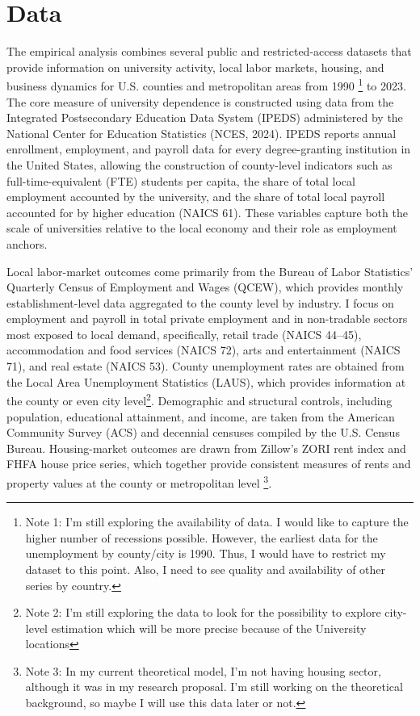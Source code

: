 
\newpage
\section{ Data}

\noindent The empirical analysis combines several public and restricted-access datasets that provide information on university activity, local labor markets, housing, and business dynamics for U.S. counties and metropolitan areas from 1990 \footnote{Note 1: I'm still exploring the availability of data. I would like to capture the higher number of recessions possible. However, the earliest data for the unemployment by county/city is 1990. Thus, I would have to restrict my dataset to this point. Also, I need to see quality and availability of other series by country.} to 2023. The core measure of university dependence is constructed using data from the Integrated Postsecondary Education Data System (IPEDS) administered by the National Center for Education Statistics (NCES, 2024). IPEDS reports annual enrollment, employment, and payroll data for every degree-granting institution in the United States, allowing the construction of county-level indicators such as full-time-equivalent (FTE) students per capita, the share of total local employment accounted by the university, and the share of total local payroll accounted for by higher education (NAICS 61). These variables capture both the scale of universities relative to the local economy and their role as employment anchors.

\noindent Local labor-market outcomes come primarily from the Bureau of Labor Statistics’ Quarterly Census of Employment and Wages (QCEW), which provides monthly establishment-level data aggregated to the county level by industry. I focus on employment and payroll in total private employment and in non-tradable sectors most exposed to local demand, specifically, retail trade (NAICS 44–45), accommodation and food services (NAICS 72), arts and entertainment (NAICS 71), and real estate (NAICS 53). County unemployment rates are obtained from the Local Area Unemployment Statistics (LAUS), which provides information at the county or even city level\footnote{Note 2: I'm still exploring the data to look for the possibility to explore city-level estimation which will be more precise because of the University locations}. Demographic and structural controls, including population, educational attainment, and income, are taken from the American Community Survey (ACS) and decennial censuses compiled by the U.S. Census Bureau. Housing-market outcomes are drawn from Zillow’s ZORI rent index and FHFA house price series, which together provide consistent measures of rents and property values at the county or metropolitan level \footnote{Note 3: In my current theoretical model, I'm not having housing sector, although it was in my research proposal. I'm still working on the theoretical background, so maybe I will use this data later or not.}.

